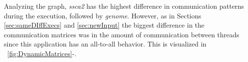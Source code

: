 Analyzing the graph, \emph{ssca2} has the highest difference in communication patterns during the execution, followed by \emph{genome}. However, as in Sections \ref{sec:sameDIffExecs} and \ref{sec:newInput} the biggest difference in the communication matrices was in the amount of communication between threads since this application has an all-to-all behavior. This is visualized in \figurename~\ref{fig:DynamicMatrices}-.
\begin{figure}[!t]
	\centering
\end{figure}
